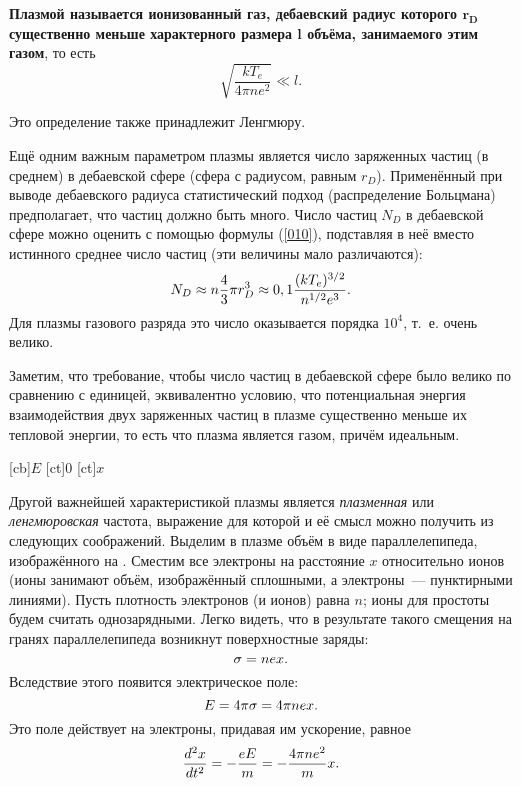 {\bf Плазмой называется ионизованный газ, дебаевский радиус которого $\boldsymbol{r_D}$ существенно меньше характерного
размера $\boldsymbol{l}$ объёма, занимаемого этим газом}, то есть
\begin{equation*}
	\sqrt{\frac{kT_e}{4\pi ne^2}}\ll l.
\end{equation*}

Это определение также принадлежит Ленгмюру.

Ещё одним важным параметром плазмы является число заряженных частиц (в среднем) в дебаевской сфере (сфера с радиусом,
равным $r_D$). Применённый при выводе дебаевского радиуса статистический подход (распределение Больцмана) предполагает,
что частиц должно быть много. Число частиц $N_D$ в дебаевской сфере можно оценить с помощью формулы (\eqref{010}),
подставляя в неё вместо истинного среднее число частиц (эти величины мало различаются):
\begin{equation}
  \eqmark[41l]
N_D\approx n\frac43\pi r_D^3\approx0,1\frac{(kT_e)^{3/2}}{n^{1/2}e^3}.
\end{equation}
Для плазмы газового разряда это число оказывается порядка $10^4$, т.~е. очень велико.

Заметим, что требование, чтобы число частиц в дебаевской сфере было велико по сравнению с единицей, эквивалентно
условию, что потенциальная энергия взаимодействия двух заряженных частиц в плазме существенно меньше их тепловой
энергии, то есть что плазма является газом, причём идеальным.

[cb]{$E$}
[ct]{0}
[ct]{$x$}

Другой важнейшей характеристикой плазмы является \textit{плазменная} или \textit{ленгмюровская} частота, выражение для
которой и её смысл можно получить из следующих соображений. Выделим в плазме объём в виде параллелепипеда, изображённого
на . Сместим все электроны на расстояние $x$ относительно ионов (ионы занимают объём, изображённый сплошными, а
электроны~--- пунктирными линиями). Пусть плотность электронов (и ионов) равна $n$; ионы для простоты будем считать
однозарядными. Легко видеть, что в результате такого смещения на гранях параллелепипеда возникнут поверхностные заряды:
\begin{equation}
  \eqmark[012]
\sigma=nex.
\end{equation}
Вследствие этого появится электрическое поле:
\begin{equation}
  \eqmark[013]
E=4\pi\sigma=4\pi nex.
\end{equation}
Это поле действует на электроны, придавая им ускорение, равное
\begin{equation}
  \eqmark[014]
\frac{d^2x}{dt^2}=-\frac{eE}{m}=-\frac{4\pi ne^2}{m}x.
\end{equation}

